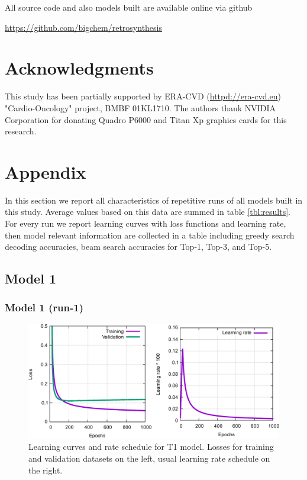 \documentclass{article}
\begin{document}
All source code and also models built are available online via github
\begin{center}
  \url{https://github.com/bigchem/retrosynthesis}
\end{center}

\section*{Acknowledgments}
This study has been partially supported by ERA-CVD (\url{httpd://era-cvd.eu}) "Cardio-Oncology" project, BMBF 01KL1710.
The authors thank NVIDIA Corporation for donating Quadro P6000 and Titan Xp graphics cards for this research.

  

 
 \newpage
 
\section{Appendix}
\label{sec:appendix}

In this section we report all characteristics of repetitive runs of all models built in this study. Average values based on this data are summed in table \ref{tbl:results}. For every run we report learning curves with loss functions and learning rate, then model relevant information are collected in a table including greedy search decoding accuracies, beam search accuracies for Top-1, Top-3, and Top-5.

\subsection{Model 1} 
\subsubsection{Model 1 (run-1)}
  
\begin{figure}[h!]
  \centering
  \includegraphics[width = 16.5cm]{images/t1-1.pdf}
  \caption{Learning curves and rate schedule for T1 model. Losses for training and validation datasets on the left, usual learning rate schedule on the right.}
  \label{fig:t11}
\end{figure}
\end{document}
